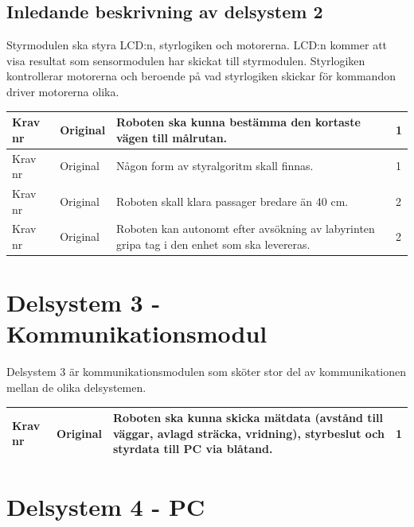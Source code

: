 \documentclass[11pt]{article}
\newcounter{kravc}
\newcommand{\kravcc}{
	\thekravc
	\stepcounter{kravc}
}
\begin{document}
\begin{flushleft}
\subsection{Inledande beskrivning av delsystem 2}
Styrmodulen ska styra LCD:n, styrlogiken och motorerna.
LCD:n kommer att visa resultat som sensormodulen har skickat till styrmodulen. Styrlogiken kontrollerar motorerna och beroende på vad styrlogiken skickar för kommandon driver motorerna olika.

\begin{center}
\begin{longtable}{|l|l|p{.70\linewidth}|l|} \hline

Krav nr\kravcc &
Original &
Roboten ska kunna bestämma den kortaste vägen till målrutan. &
1 \\ \hline

Krav nr\kravcc &
Original &
Någon form av styralgoritm skall finnas. &
1 \\ \hline

Krav nr\kravcc &
Original &
Roboten skall klara passager bredare än 40 cm. &
2 \\ \hline

Krav nr\kravcc &
Original &
Roboten kan autonomt efter avsökning av labyrinten gripa tag i den enhet som ska levereras. &
2 \\ \hline

\end{longtable}
\end{center}


\pagebreak

\section{Delsystem 3 - Kommunikationsmodul}
Delsystem 3 är kommunikationsmodulen som sköter stor del av kommunikationen mellan de olika delsystemen. 
\begin{center}
\begin{longtable}{|l|l|p{.70\linewidth}|l|} \hline

Krav nr\kravcc &
Original &
Roboten ska kunna skicka mätdata (avstånd till väggar, avlagd sträcka, vridning), styrbeslut och styrdata till PC via blåtand. &
1 \\ \hline

\end{longtable}
\end{center}

\section{Delsystem 4 - PC}


\end{flushleft}
\end{document}
